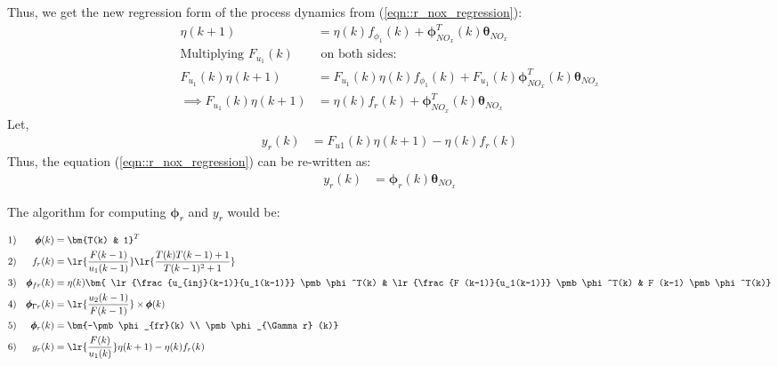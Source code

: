 Thus, we get the new regression form of the process dynamics from (\ref{eqn::r_nox_regression}):
\begin{align*}
        \eta (k+1) &=  \eta(k) f_{\phi_1}(k) +
                     \pmb \phi_{NO_x}^T (k) \pmb \theta_{NO_x}\\
        \text{Multiplying } F_{u_1}(k) & \text{ on both sides:}\\
        F_{u_1}(k) \eta (k+1) &=  F_{u_1}(k) \eta(k) f_{\phi_1}(k) +
                                        F_{u_1}(k) \pmb \phi_{NO_x}^T (k) \pmb \theta_{NO_x}\\
        \implies  F_{u_1}(k) \eta (k+1) &= \eta(k) f_r (k) + \pmb \phi_{NO_x}^T (k) \pmb \theta_{NO_x}
\end{align*}
Let,
\begin{align}
       y_r(k) &= F_{u1}(k) \eta (k+1) - \eta(k) f_r (k)
\end{align}
Thus, the equation (\ref{eqn::r_nox_regression}) can be re-written as:
\begin{align}
       y_r(k) &= \pmb \phi_r(k) \pmb \theta_{NO_x}
       \label{eqn::final_simplified_regression}
\end{align}

The algorithm for computing $\pmb \phi_r$ and $y_r$ would be:

\begin{align*}
        1)&& \pmb \phi(k) &= \bm{T(k) & 1} ^T\\
        2)&& f_{r}(k) &= \lr{\frac{F(k-1)}{u_1(k-1)}} \lr{\frac{T(k)T(k-1) + 1}{T(k-1)^2 + 1}}\\
        3)&& \pmb \phi_{fr}(k) &= \eta(k)
                                        \bm{ \lr{\frac{u_{inj}(k-1)}{u_1(k-1)}} \pmb \phi^T(k)
                                              & \lr{\frac{F (k-1)}{u_1(k-1)}} \pmb \phi^T(k)
                                              & F (k-1) \pmb \phi^T(k)} \\
        4)&& \pmb \phi_{\Gamma r}(k) &= \lr{\frac{u_2(k-1)}{F(k-1)}} \times \pmb \phi(k) \\
        5)&& \pmb \phi_{r}(k) &= \bm{-\pmb \phi_{fr}(k) \\ \pmb \phi_{\Gamma r} (k)} \\
        6)&& y_{r}(k) &= \lr{\frac{F(k)}{u_1(k)}} \eta (k+1) - \eta(k) f_r (k)
\end{align*}
